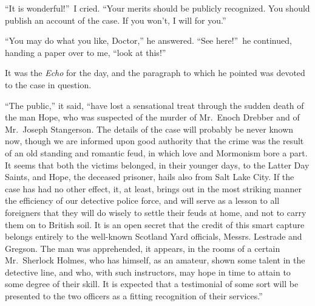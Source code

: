 \documentclass[12pt,english]{book}
\begin{document}
{}``It is wonderful!''\ I cried. {}``Your merits should be publicly
recognized. You should publish an account of the case. If you won't,
I will for you.''

{}``You may do what you like, Doctor,'' he answered. {}``See here!''\ he
continued, handing a paper over to me, {}``look at this!''

It was the \textit{Echo} for the day, and the paragraph to which he
pointed was devoted to the case in question.

{}``The public,'' it said, {}``have lost a sensational treat through
the sudden death of the man Hope, who was suspected of the murder
of Mr.\ Enoch Drebber and of Mr.\ Joseph Stangerson. The details
of the case will probably be never known now, though we are informed
upon good authority that the crime was the result of an old standing
and romantic feud, in which love and Mormonism bore a part. It seems
that both the victims belonged, in their younger days, to the Latter
Day Saints, and Hope, the deceased prisoner, hails also from Salt
Lake City. If the case has had no other effect, it, at least, brings
out in the most striking manner the efficiency of our detective police
force, and will serve as a lesson to all foreigners that they will
do wisely to settle their feuds at home, and not to carry them on
to British soil. It is an open secret that the credit of this smart
capture belongs entirely to the well-known Scotland Yard officials,
Messrs. Lestrade and Gregson. The man was apprehended, it appears,
in the rooms of a certain Mr.\ Sherlock Holmes, who has himself,
as an amateur, shown some talent in the detective line, and who, with
such instructors, may hope in time to attain to some degree of their
skill. It is expected that a testimonial of some sort will be presented
to the two officers as a fitting recognition of their services.''
\end{document}
